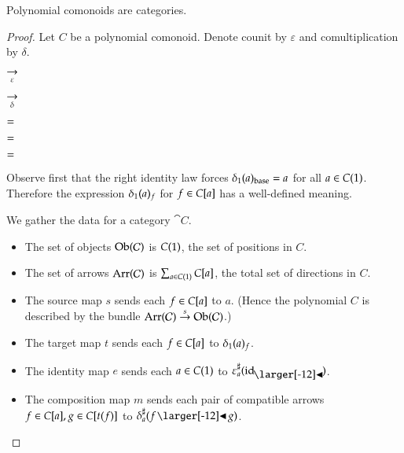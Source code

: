 \documentclass{amsart}
\begin{document}
\iffalse
  The directions from $a$ are of the form $f' \subd g'$,
  where $f'$ is a direction from $a_\base$ and $g'$ is a direction
  from $a_{f'}$. Hence if the expression
  $\dirmapof{\alpha}{x}{f} \subd dirmapof{\beta}{y}{g}$ is to describe a
  direction from $a$, then $x$ should be $a_\base$, and $y$ should
  be $a_{f'}$.
\fi

\begin{prop}
  Polynomial comonoids are categories.
\end{prop}
\begin{proof}
  Let $C$ be a polynomial comonoid. Denote counit by $\varepsilon$
  and comultiplication by $\delta$.
  
  \begin{center}
    
    \hspace{-.75em}
    $\underset{\varepsilon}{\to}$
    
    \quad\qquad
    
    \hspace{-.75em}
    $\underset{\delta}{\to}$
    \hspace{.5em}
    
  \end{center}

  \begin{center}
    
    \quad
    $=$
    
    $=$
    \quad
    
  \end{center}

  \begin{center}
    
    \quad
    $=$
    \quad
    
  \end{center}

  Observe first that the right identity law forces ${\delta}_1(a)_{\mathrm{base}} = a$
  for all $a \in C(1)$.
  Therefore the expression ${\delta}_1(a)_f$ for $f \in C[a]$ has a
  well-defined meaning.

  We gather the data for a category $\cat{C}$.
  \begin{itemize}
  \item The set of objects $\operatorname{Ob}(\mathcal{C})$ is $C(1)$, the set
    of positions in $C$.
  \item The set of arrows $\operatorname{Arr}(\mathcal{C})$ is
    $\sum_{a \in C(1)}C[a]$, the total set of directions in $C$.
  \item The source map $s$ sends each $f \in C[a]$ to $a$. (Hence the
    polynomial $C$ is described by the bundle
    $\operatorname{Arr}(\mathcal{C}) \overset{s}{\to} \operatorname{Ob}(\mathcal{C})$.)
  \item The target map $t$ sends each $f \in C[a]$ to ${\delta}_1(a)_f$.
  \item The identity map $e$ sends each $a \in C(1)$ to
    $\dirmapof{\varepsilon}{a}{\idsubd}$.
  \item The composition map $m$ sends each pair of compatible
    arrows ${f \in C[a]}, {g \in C[t(f)]}$ to $\dirmapof{\delta}{a}{f \subd g}$.
  \end{itemize}


\end{proof}
\end{document}
